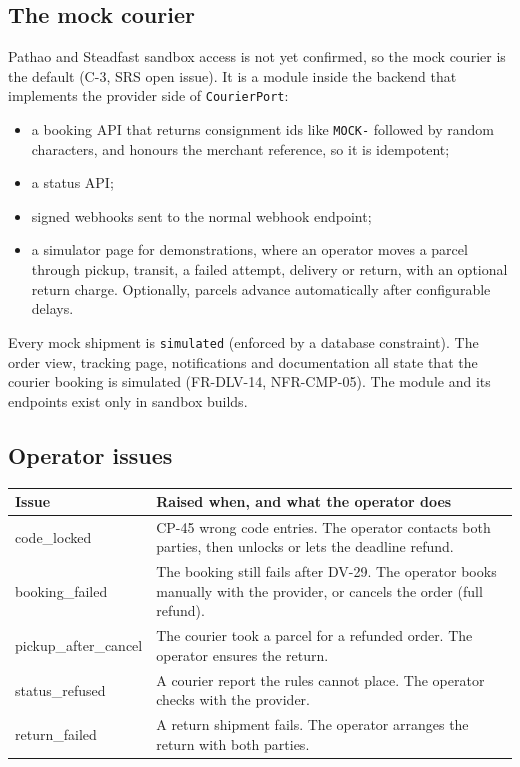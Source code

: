 \documentclass[11pt,a4paper]{article}
\newenvironment{dtable}[1]{\small\begin{longtable}{#1}}{\end{longtable}}
\begin{document}
\subsection{The mock courier}
\label{sec:mock}
Pathao and Steadfast sandbox access is not yet confirmed, so the mock courier is the default (C-3, SRS open issue). It is a module inside the backend that implements the provider side of \texttt{CourierPort}:
\begin{itemize}[nosep]
  \item a booking API that returns consignment ids like \texttt{MOCK-} followed by random characters, and honours the merchant reference, so it is idempotent;
  \item a status API;
  \item signed webhooks sent to the normal webhook endpoint;
  \item a simulator page for demonstrations, where an operator moves a parcel through pickup, transit, a failed attempt, delivery or return, with an optional return charge. Optionally, parcels advance automatically after configurable delays.
\end{itemize}
Every mock shipment is \texttt{simulated} (enforced by a database constraint). The order view, tracking page, notifications and documentation all state that the courier booking is simulated (FR-DLV-14, NFR-CMP-05). The module and its endpoints exist only in sandbox builds.

\subsection{Operator issues}
\label{sec:issues}
\begin{dtable}{@{}>{\ttfamily}p{3.6cm}>{\raggedright\arraybackslash}p{11.6cm}@{}}
\toprule
\textnormal{\textbf{Issue}} & \textbf{Raised when, and what the operator does} \\ \midrule \endhead
code\_locked & CP-45 wrong code entries. The operator contacts both parties, then unlocks or lets the deadline refund. \\
booking\_failed & The booking still fails after DV-29. The operator books manually with the provider, or cancels the order (full refund). \\
pickup\_after\_cancel & The courier took a parcel for a refunded order. The operator ensures the return. \\
status\_refused & A courier report the rules cannot place. The operator checks with the provider. \\
return\_failed & A return shipment fails. The operator arranges the return with both parties. \\
\bottomrule
\end{dtable}
\end{document}
